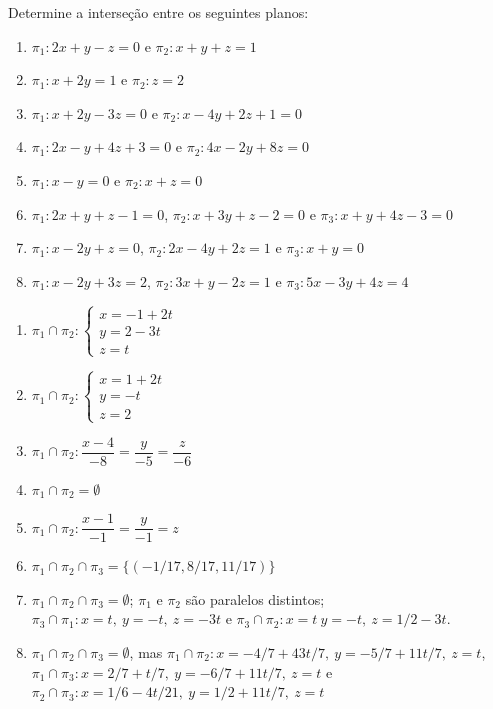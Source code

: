 \documentclass[12pt]{exam}
\begin{document}
\begin{exercicio}
    Determine a interseção entre os seguintes planos:
    \begin{enumerate}[label=({\alph*})]
        \item $\pi_1 : 2x + y - z = 0$ e $\pi_2 : x + y + z = 1$
        \item $\pi_1 : x + 2y = 1$ e $\pi_2 : z = 2$
        \item $\pi_1 : x + 2y - 3z = 0$ e $\pi_2 : x - 4y + 2z + 1 = 0$
        \item $\pi_1 : 2x - y + 4z + 3 = 0$ e $\pi_2 : 4x - 2y + 8z = 0$
        \item $\pi_1 : x - y = 0$ e $\pi_2 : x + z = 0$
        \item $\pi_1 : 2x + y + z - 1 = 0$, $\pi_2 : x + 3y + z - 2 = 0$ e $\pi_3 : x + y + 4z - 3 = 0$
        \item $\pi_1 : x - 2y + z = 0$, $\pi_2 : 2x - 4y + 2z = 1$ e $\pi_3 : x + y = 0$
        \item $\pi_1 : x - 2y + 3z = 2$, $\pi_2 : 3x + y - 2z = 1$ e $\pi_3 : 5x -3y + 4z = 4$
    \end{enumerate}
    \begin{solucao}
        \begin{enumerate}[label=({\alph*})]
            \item $\pi_1 \cap \pi_2 : \begin{cases}
                          x = -1 + 2t \\
                          y = 2 - 3t  \\
                          z = t
                      \end{cases}$
            \item $\pi_1 \cap \pi_2 : \begin{cases}
                          x = 1 + 2t \\
                          y = - t    \\
                          z = 2
                      \end{cases}$
            \item $\pi_1 \cap \pi_2 : \dfrac{x - 4}{-8} = \dfrac{y}{-5} = \dfrac{z}{-6}$
            \item $\pi_1 \cap \pi_2 = \emptyset$
            \item $\pi_1 \cap \pi_2 : \dfrac{x - 1}{-1} = \dfrac{y}{-1} = z$
            \item $\pi_1 \cap \pi_2 \cap \pi_3 = \{(-1/17, 8/17, 11/17)\}$
            \item $\pi_1 \cap \pi_2 \cap \pi_3 = \emptyset$; $\pi_1$ e $\pi_2$ são paralelos distintos; $\pi_3 \cap \pi_1 : x = t,\ y = -t,\ z = -3t$ e $\pi_3 \cap \pi_2 : x = t\ y = -t,\ z = 1/2 - 3t$.
            \item $\pi_1 \cap \pi_2 \cap \pi_3 = \emptyset$, mas $\pi_1 \cap \pi_2 : x = -4/7 + 43t/7,\ y = -5/7 + 11t/7,\ z = t $, $\pi_1 \cap \pi_3 : x = 2/7 + t/7,\ y = -6/7 + 11t/7,\ z = t$ e $\pi_2 \cap \pi_3 : x = 1/6 - 4t/21,\ y = 1/2 + 11t/7,\ z = t$
        \end{enumerate}
    \end{solucao}
\end{exercicio}
\end{document}
